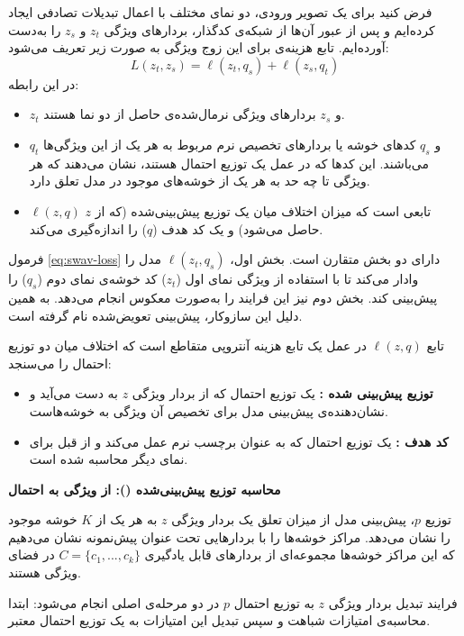 فرض کنید برای یک تصویر ورودی، دو نمای مختلف با اعمال تبدیلات تصادفی ایجاد کرده‌ایم و پس از عبور آن‌ها از شبکه‌ی کدگذار، بردارهای ویژگی
$z_t$ و $z_s$ را به‌دست آورده‌ایم.
تابع هزینه‌ی  برای این زوج ویژگی به صورت زیر تعریف می‌شود:
\begin{equation}
    L(z_t, z_s) = \ell(z_t, q_s) + \ell(z_s, q_t)
    \label{eq:swav-loss}
\end{equation}
در این رابطه:
\begin{itemize}
    \item $z_t$ و $z_s$ بردارهای ویژگی نرمال‌شده‌ی حاصل از دو نما هستند.
    \item $q_t$ و $q_s$ کدهای خوشه یا بردارهای تخصیص نرم مربوط به هر یک از این ویژگی‌ها می‌باشند. این کدها که در عمل یک توزیع احتمال هستند، نشان می‌دهند که هر ویژگی تا چه حد به هر یک از خوشه‌های موجود در مدل تعلق دارد.
    \item $\ell(z,q)$ تابعی است که میزان اختلاف میان یک توزیع پیش‌بینی‌شده (که از $z$ حاصل می‌شود) و یک کد هدف ($q$) را اندازه‌گیری می‌کند.
\end{itemize}
فرمول \ref{eq:swav-loss} دارای دو بخش متقارن است. بخش اول، $\ell(z_t,q_s)$
مدل را وادار می‌کند تا با استفاده از ویژگی نمای اول ($z_t$) کد خوشه‌ی نمای دوم ($q_s$) را پیش‌بینی کند. بخش دوم نیز این فرایند را به‌صورت معکوس انجام می‌دهد. به همین دلیل این سازوکار، پیش‌بینی تعویض‌شده نام گرفته است.

تابع $\ell(z,q)$ در عمل یک تابع هزینه آنتروپی متقاطع است که اختلاف میان دو توزیع احتمال را می‌سنجد:
\begin{itemize}
    \item\textbf{توزیع پیش‌بینی شده :} یک توزیع احتمال که از بردار ویژگی $z$ به دست می‌آید و نشان‌دهنده‌ی پیش‌بینی مدل برای تخصیص آن ویژگی به خوشه‌هاست.
    \item\textbf{کد هدف :} یک توزیع احتمال که به عنوان برچسب نرم عمل می‌کند و از قبل برای نمای دیگر محاسبه شده است.
\end{itemize}

\noindent\textbf{محاسبه توزیع پیش‌بینی‌شده (): از ویژگی به احتمال}

توزیع $p$،
پیش‌بینی مدل از میزان تعلق یک بردار ویژگی $z$
به هر یک از $K$ خوشه موجود را نشان می‌دهد. مراکز خوشه‌ها را با بردارهایی تحت عنوان پیش‌نمونه نشان می‌دهیم که این مراکز خوشه‌ها مجموعه‌ای از بردارهای قابل یادگیری $C=\{c_1,...,c_k\}$
در فضای ویژگی هستند.

فرایند تبدیل بردار ویژگی 
$z$
به توزیع احتمال 
$p$
در دو مرحله‌ی اصلی انجام می‌شود: ابتدا محاسبه‌ی امتیازات شباهت و سپس تبدیل این امتیازات به یک توزیع احتمال معتبر.

